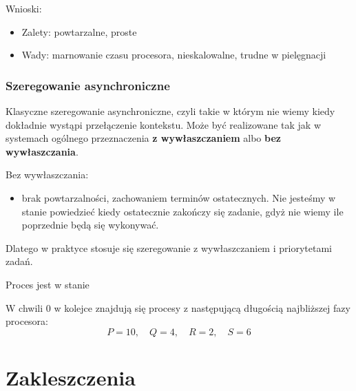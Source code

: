     Wnioski:
    \begin{itemize}
        \item Zalety: powtarzalne, proste
        \item Wady: marnowanie czasu procesora, nieskalowalne, trudne w pielęgnacji
    \end{itemize}

\subsubsection{Szeregowanie asynchroniczne}   
    Klasyczne szeregowanie asynchroniczne, czyli takie w którym nie wiemy kiedy dokładnie wystąpi przełączenie kontekstu. Może być realizowane tak jak w systemach ogólnego przeznaczenia \textbf{z wywłaszczaniem} albo \textbf{bez wywłaszczania}. 

    Bez wywłaszczania:
    \begin{itemize}
        \item brak powtarzalności, zachowaniem terminów ostatecznych. Nie jesteśmy w stanie powiedzieć kiedy ostatecznie zakończy się zadanie, gdyż nie wiemy ile poprzednie będą się wykonywać.
    \end{itemize}

    Dlatego w praktyce stosuje się szeregowanie z wywłaszczaniem i priorytetami zadań.

\begin{problems}
    \prob Proces jest w stanie

    \prob W chwili $0$ w kolejce znajdują się procesy z następującą długością najbliższej fazy procesora: $$P = 10, \quad Q = 4, \quad R = 2, \quad S = 6$$
\end{problems}

\section{Zakleszczenia}

